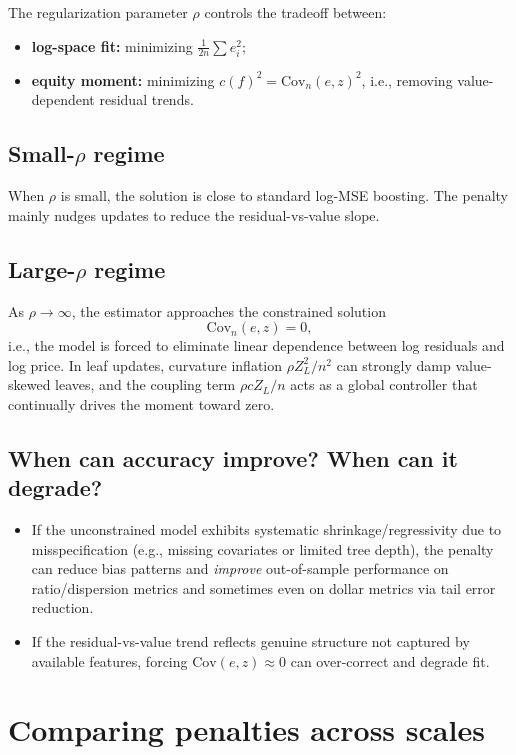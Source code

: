 \documentclass[11pt]{article}
\theoremstyle{plain}
\theoremstyle{definition}
\newcommand{\1}{\mathbf{1}}
\newcommand{\Cov}{\text{Cov}}
\begin{document}
{The regularization parameter \(\rho\) controls the tradeoff between:
\begin{itemize}[leftmargin=*]
\item \textbf{log-space fit:} minimizing \(\frac{1}{2n}\sum e_i^2\);
\item \textbf{equity moment:} minimizing \(c(f)^2 = \Cov_n(e,z)^2\), i.e., removing value-dependent residual trends.
\end{itemize}

\subsection{Small-\(\rho\) regime}
When \(\rho\) is small, the solution is close to standard log-MSE boosting. The penalty mainly nudges updates to reduce the residual-vs-value slope.

\subsection{Large-\(\rho\) regime}
As \(\rho\to\infty\), the estimator approaches the constrained solution
\[
\Cov_n(e,z)=0,
\]
i.e., the model is forced to eliminate linear dependence between log residuals and log price. In leaf updates, curvature inflation \(\rho Z_L^2/n^2\) can strongly damp value-skewed leaves, and the coupling term \(\rho c Z_L/n\) acts as a global controller that continually drives the moment toward zero.

\subsection{When can accuracy improve? When can it degrade?}
\begin{itemize}[leftmargin=*]
\item If the unconstrained model exhibits systematic shrinkage/regressivity due to misspecification (e.g., missing covariates or limited tree depth), the penalty can reduce bias patterns and \emph{improve} out-of-sample performance on ratio/dispersion metrics and sometimes even on dollar metrics via tail error reduction.
\item If the residual-vs-value trend reflects genuine structure not captured by available features, forcing \(\Cov(e,z)\approx 0\) can over-correct and degrade fit.
\end{itemize}

\section{Comparing penalties across scales}

}
\end{document}

